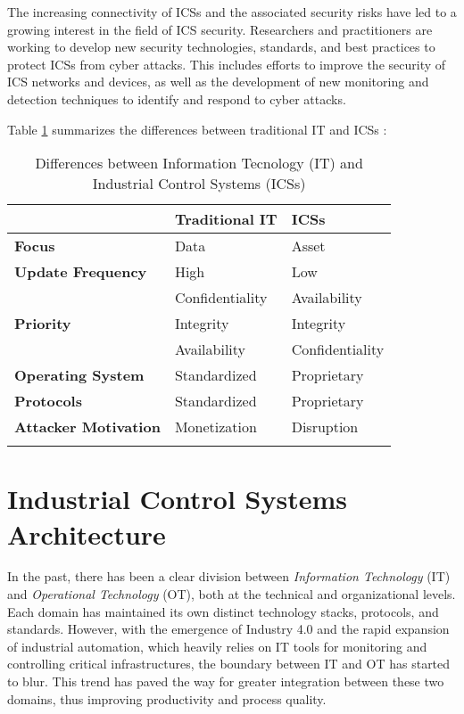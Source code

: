 \bigskip
The increasing connectivity of ICSs and the associated security risks have led to a growing interest in the field of ICS security. Researchers and practitioners are working to develop new security technologies, standards, and best practices to protect ICSs from cyber attacks. This includes efforts to improve the security of ICS networks and devices, as well as the development of new monitoring and detection techniques to identify and respond to cyber attacks.

\bigskip
\noindent Table \ref{table:2_it_ot_difference} summarizes the differences between traditional IT and ICSs \cite{tesi_phd_norvegese}:

\bigskip
\begin{longtable}[c]{p{}  p{}  p{}}
	\hline
	& \textbf{Traditional IT} & \textbf{ICSs} \\ [0.5ex] 
	\hline
	\textbf{Focus} & Data & Asset \\
	\hline
	\textbf{Update Frequency} & High & Low \\
	\hline 
	\multirow{3}{4em}{\textbf{Priority}} & Confidentiality & Availability \\
	& Integrity & Integrity \\
	& Availability & Confidentiality \\
	\hline
	\textbf{Operating System} & Standardized & Proprietary \\
	\hline
	\textbf{Protocols} & Standardized & Proprietary \\
	\hline
	\textbf{Attacker Motivation} & Monetization & Disruption \\
	\hline
	
	\caption{Differences between Information Tecnology (IT) and Industrial Control Systems (ICSs)}
	\label{table:2_it_ot_difference}
\end{longtable}
\vfill

\section{Industrial Control Systems Architecture}
\label{sec:2_ics_components}
In the past, there has been a clear division between \textit{Information Technology} (IT) and \textit{Operational Technology} (OT), both at the technical and organizational levels. Each domain has maintained its own distinct technology stacks, protocols, and standards. However, with the emergence of Industry 4.0 and the rapid expansion of industrial automation, which heavily relies on IT tools for monitoring and controlling critical infrastructures, the boundary between IT and OT has started to blur. This trend has paved the way for greater integration between these two domains, thus improving productivity and process quality.

